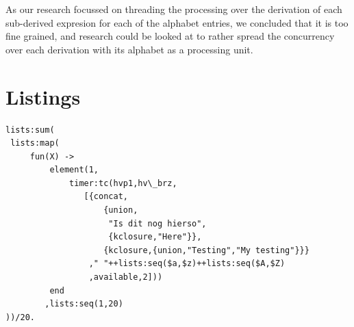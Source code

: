 \documentclass[a4paper,11pt]{report}
\begin{document}
As our research focussed on threading the processing over the
derivation of each sub-derived expresion for each of the alphabet
entries, we concluded that it is too fine grained, and research could
be looked at to rather spread the concurrency over each derivation
with its alphabet as a processing unit.

\appendix
\chapter{Listings}
\begin{lstlisting}
lists:sum(
 lists:map(
	 fun(X) -> 
		 element(1,
			 timer:tc(hvp1,hv\_brz,
				[{concat,
					{union,
					 "Is dit nog hierso",
					 {kclosure,"Here"}},
					{kclosure,{union,"Testing","My testing"}}}
				 ," "++lists:seq($a,$z)++lists:seq($A,$Z)
				 ,available,2]))
		 end
		,lists:seq(1,20)
))/20. 
\end{lstlisting}
\end{document}
